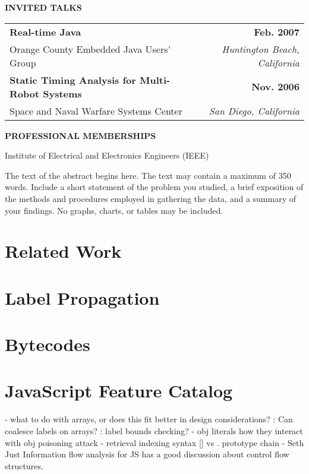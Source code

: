 \documentclass[12pt,fleqn]{ucithesis}
\begin{document}
{	\vspace{12pt}
	\textbf{INVITED TALKS}

	\begin{tabular*}{1\textwidth}{@{\extracolsep{\fill}}lr}
		\textbf{Real-time Java} & \textbf{Feb. 2007} \\
		\vspace{6pt}
		Orange County Embedded Java Users' Group & \emph{Huntington Beach, California} \\
		\textbf{Static Timing Analysis for Multi-Robot Systems} & \textbf{Nov. 2006} \\
		Space and Naval Warfare Systems Center & \emph{San Diego, California} \\
	\end{tabular*}

	\vspace{12pt}
	\textbf{PROFESSIONAL MEMBERSHIPS}

	Institute of Electrical and Electronics Engineers (IEEE)
}

\thesisabstract
{
	The text of the abstract begins here. The text may contain a maximum of 350 words. Include a short statement of the 
problem you studied, a brief exposition of the methods and procedures employed in gathering the data, and a summary of your 
findings. No graphs, charts, or tables may be included.
}

\preliminarypages



\chapter{Related Work}


\chapter{Label Propagation}
\chapter{Bytecodes}
\chapter{JavaScript Feature Catalog}
 - what to do with arrays, or does this fit better in design considerations?
   : Can coalesce labels on arrays?
   : label bounds checking? 
 - obj literals
   how they interact with obj poisoning attack
 - retrieval
   indexing syntax [] vs .
   prototype chain
 - Seth Just Information flow analysis for JS has a good discussion about control flow structures.
\end{document}
